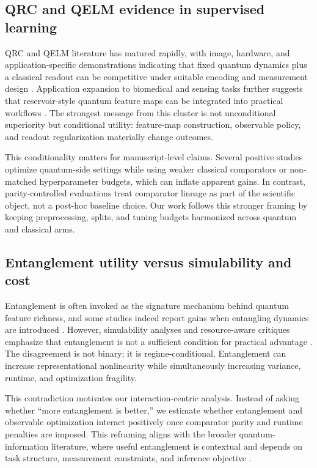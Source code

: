 \documentclass{article} %
\begin{document}
\subsection{QRC and QELM evidence in supervised learning}
QRC and QELM literature has matured rapidly, with image, hardware, and application-specific demonstrations indicating that fixed quantum dynamics plus a classical readout can be competitive under suitable encoding and measurement design \citep{S001,S003,S004,S010,S023,S029,S032,S033,S036,S039}. Application expansion to biomedical and sensing tasks further suggests that reservoir-style quantum feature maps can be integrated into practical workflows \citep{S009,S014,S015,S017,S021,S031}. The strongest message from this cluster is not unconditional superiority but conditional utility: feature-map construction, observable policy, and readout regularization materially change outcomes.

This conditionality matters for manuscript-level claims. Several positive studies optimize quantum-side settings while using weaker classical comparators or non-matched hyperparameter budgets, which can inflate apparent gains. In contrast, parity-controlled evaluations treat comparator lineage as part of the scientific object, not a post-hoc baseline choice. Our work follows this stronger framing by keeping preprocessing, splits, and tuning budgets harmonized across quantum and classical arms.

\subsection{Entanglement utility versus simulability and cost}
Entanglement is often invoked as the signature mechanism behind quantum feature richness, and some studies indeed report gains when entangling dynamics are introduced \citep{S003,S033,S039}. However, simulability analyses and resource-aware critiques emphasize that entanglement is not a sufficient condition for practical advantage \citep{S002,S025,S026,S028,S034,S038}. The disagreement is not binary; it is regime-conditional. Entanglement can increase representational nonlinearity while simultaneously increasing variance, runtime, and optimization fragility.

This contradiction motivates our interaction-centric analysis. Instead of asking whether ``more entanglement is better,'' we estimate whether entanglement and observable optimization interact positively once comparator parity and runtime penalties are imposed. This reframing aligns with the broader quantum-information literature, where useful entanglement is contextual and depends on task structure, measurement constraints, and inference objective \citep{S012,S018,S019}.
\end{document}
